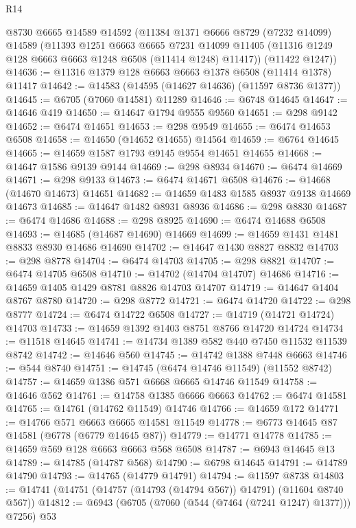 \begin{lexlean}{R14}
\begin{coremodule}
    @8730
    @6665
    @14589
    @14592
    (@11384
      @1371
      @6666
      @8729
      (@7232 @14099)
      @14589
      (@11393
        @1251
        @6663
        @6665
        @7231
        @14099
        @11405
        (@11316 @1249 @128 @6663 @6663 @1248 @6508 (@11414 @1248) @11417))
      (@11422 @1247))
@14636 := @11316 @1379 @128 @6663 @6663 @1378 @6508 (@11414 @1378) @11417
@14642 := @14583 (@14595 (@14627 @14636) (@11597 @8736 @1377))
@14645 := @6705 (@7060 @14581) @11289
@14646 := @6748 @14645
@14647 := @14646 @419
@14650 := @14647 @1794 @9555 @9560
@14651 := @298 @9142
@14652 := @6474 @14651
@14653 := @298 @9549
@14655 := @6474 @14653 @6508
@14658 := @14650 (@14652 @14655) @14564
@14659 := @6764 @14645
@14665 := @14659 @1587 @1793 @9145 @9554 @14651 @14655
@14668 := @14647 @1586 @9139 @9144
@14669 := @298 @8934
@14670 := @6474 @14669
@14671 := @298 @9133
@14673 := @6474 @14671 @6508
@14676 := @14668 (@14670 @14673) @14651
@14682 := @14659 @1483 @1585 @8937 @9138 @14669 @14673
@14685 := @14647 @1482 @8931 @8936
@14686 := @298 @8830
@14687 := @6474 @14686
@14688 := @298 @8925
@14690 := @6474 @14688 @6508
@14693 := @14685 (@14687 @14690) @14669
@14699 := @14659 @1431 @1481 @8833 @8930 @14686 @14690
@14702 := @14647 @1430 @8827 @8832
@14703 := @298 @8778
@14704 := @6474 @14703
@14705 := @298 @8821
@14707 := @6474 @14705 @6508
@14710 := @14702 (@14704 @14707) @14686
@14716 := @14659 @1405 @1429 @8781 @8826 @14703 @14707
@14719 := @14647 @1404 @8767 @8780
@14720 := @298 @8772
@14721 := @6474 @14720
@14722 := @298 @8777
@14724 := @6474 @14722 @6508
@14727 := @14719 (@14721 @14724) @14703
@14733 := @14659 @1392 @1403 @8751 @8766 @14720 @14724
@14734 := @11518 @14645
@14741 := @14734 @1389 @582 @440 @7450 @11532 @11539 @8742
@14742 := @14646 @560
@14745 := @14742 @1388 @7448 @6663
@14746 := @544 @8740
@14751 := @14745 (@6474 @14746 @11549) (@11552 @8742)
@14757 := @14659 @1386 @571 @6668 @6665 @14746 @11549
@14758 := @14646 @562
@14761 := @14758 @1385 @6666 @6663
@14762 := @6474 @14581
@14765 := @14761 (@14762 @11549) @14746
@14766 := @14659 @172
@14771 := @14766 @571 @6663 @6665 @14581 @11549
@14778 := @6773 @14645 @87 @14581 (@6778 (@6779 @14645 @87))
@14779 := @14771 @14778
@14785 := @14659 @569 @128 @6663 @6663 @568 @6508
@14787 := @6943 @14645 @13
@14789 := @14785 (@14787 @568)
@14790 := @6798 @14645
@14791 := @14789 @14790
@14793 := @14765 (@14779 @14791)
@14794 := @11597 @8738
@14803 := @14741 (@14751 (@14757 (@14793 (@14794 @567)) @14791) (@11604 @8740 @567))
@14812 := @6943 (@6705 (@7060 (@544 (@7464 (@7241 @1247) @1377))) @7256) @53

\end{coremodule}
\end{lexlean}
